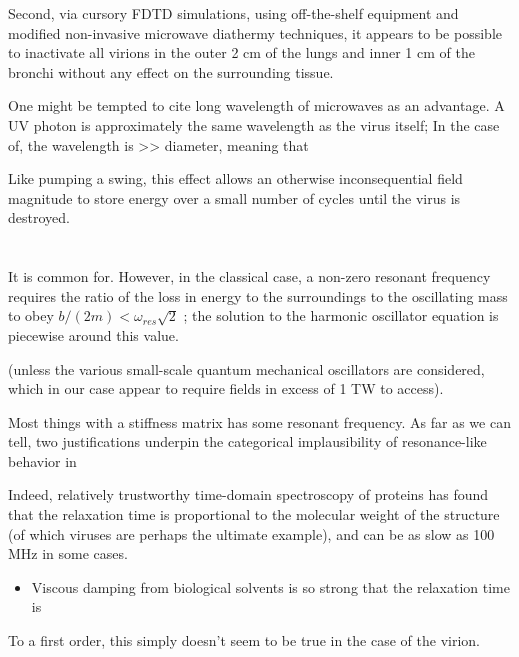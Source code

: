 \documentclass[paper.tex]{subfiles}
\begin{document}
\begin{multicols}{1}
Second, via cursory FDTD simulations, using off-the-shelf equipment and modified non-invasive microwave diathermy techniques, it appears to be possible to inactivate all virions in the outer 2 cm of the lungs and inner 1 cm of the bronchi without any effect on the surrounding tissue. 




One might be tempted to cite long wavelength of microwaves as an advantage. A UV photon is approximately the same wavelength as the virus itself;  In the case of, the wavelength is >> diameter, meaning that 




Like pumping a swing, this effect allows an otherwise inconsequential field magnitude to store energy over a small number of cycles until the virus is destroyed. \\
\\\\


It is common for.  However, in the classical case, a non-zero resonant frequency requires the ratio of the loss in energy to the surroundings to the oscillating mass to obey $b/(2m) < \omega_{res} \sqrt{2}$ \cite{Driven}; the solution to the harmonic oscillator equation is piecewise around this value. 

(unless the various small-scale quantum mechanical oscillators are considered, which in our case appear to require fields in excess of 1 TW to access).


Most things with a stiffness matrix has some resonant frequency\citationneeded. As far as we can tell, two justifications underpin the categorical implausibility of resonance-like behavior in 




Indeed, relatively trustworthy time-domain spectroscopy of proteins \cite{Microwave1994} has found that the relaxation time is proportional to the molecular weight of the structure (of which viruses are perhaps the ultimate example), and can be as slow as 100 MHz in some cases. 


\begin{itemize}
	\item Viscous damping from biological solvents is so strong that the relaxation time is 
\end{itemize}

To a first order, this simply doesn't seem to be true in the case of the virion.






\end{multicols}
\end{document}

